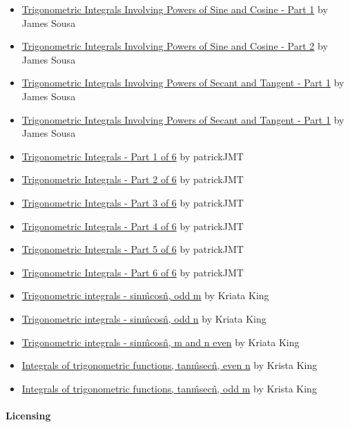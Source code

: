 \begin{itemize}
    \item \href{https://youtu.be/Sv-bSbAQeXc}{Trigonometric Integrals Involving Powers of Sine and Cosine - Part 1} by James Sousa
    \item \href{https://youtu.be/vPnuigP8I6I}{Trigonometric Integrals Involving Powers of Sine and Cosine - Part 2} by James Sousa
    \item \href{https://youtu.be/RGaDMqhOg8Y}{Trigonometric Integrals Involving Powers of Secant and Tangent - Part 1} by James Sousa
    \item \href{https://youtu.be/o8sIHlS17qc}{Trigonometric Integrals Involving Powers of Secant and Tangent - Part 1} by James Sousa
    \item \href{https://youtu.be/lTqnlihOC4o}{Trigonometric Integrals - Part 1 of 6} by patrickJMT
    \item \href{https://youtu.be/zyg9k1je7Fg}{Trigonometric Integrals - Part 2 of 6} by patrickJMT
    \item \href{https://youtu.be/BhJ4soojyAQ}{Trigonometric Integrals - Part 3 of 6} by patrickJMT
    \item \href{https://youtu.be/8CHHY-2Ctug}{Trigonometric Integrals - Part 4 of 6} by patrickJMT
    \item \href{https://youtu.be/QdNScjd5bno}{Trigonometric Integrals - Part 5 of 6} by patrickJMT
    \item \href{https://youtu.be/m3zG7c52QR4}{Trigonometric Integrals - Part 6 of 6} by patrickJMT
    \item \href{https://youtu.be/WYhyq_mTCZs}{Trigonometric integrals - sin\^mcos\^n, odd m} by Kriata King
    \item \href{https://youtu.be/RRDiT-djQPk}{Trigonometric integrals - sin\^mcos\^n, odd n} by Kriata King
    \item \href{https://youtu.be/rpbr2nH7lNY}{Trigonometric integrals - sin\^mcos\^n, m and n even} by Kriata King
    \item \href{https://youtu.be/CK2SfrzF_c4}{Integrals of trigonometric functions, tan\^msec\^n, even n} by Krista King
    \item \href{https://youtu.be/0TuZSSah5hc}{Integrals of trigonometric functions, tan\^msec\^n, odd m} by Krista King
\end{itemize}

\paragraph{Licensing}



